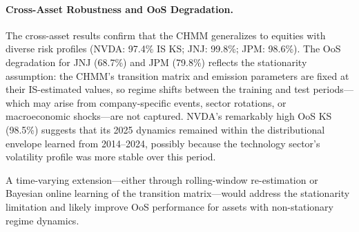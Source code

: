 \paragraph{Cross-Asset Robustness and OoS Degradation.}
The cross-asset results confirm that the CHMM generalizes to equities with diverse risk profiles (NVDA: 97.4\% IS KS; JNJ: 99.8\%; JPM: 98.6\%).
The OoS degradation for JNJ (68.7\%) and JPM (79.8\%) reflects the stationarity assumption: the CHMM's transition matrix and emission parameters are fixed at their IS-estimated values, so regime shifts between the training and test periods---which may arise from company-specific events, sector rotations, or macroeconomic shocks---are not captured.
NVDA's remarkably high OoS KS (98.5\%) suggests that its 2025 dynamics remained within the distributional envelope learned from 2014--2024, possibly because the technology sector's volatility profile was more stable over this period.

A time-varying extension---either through rolling-window re-estimation or Bayesian online learning of the transition matrix---would address the stationarity limitation and likely improve OoS performance for assets with non-stationary regime dynamics.

